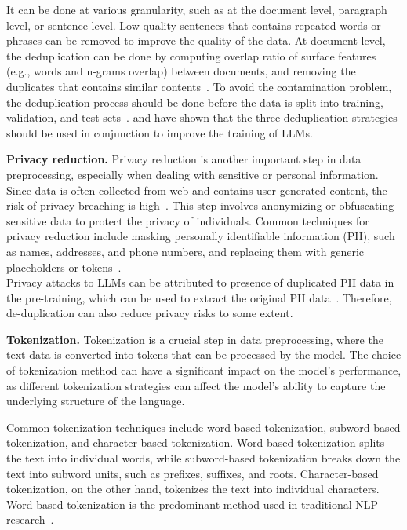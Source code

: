 It can be done at various granularity, such as at the document level, paragraph level, or sentence level.
Low-quality sentences that contains repeated words or phrases can be removed to improve the quality of the data.
At document level, the deduplication can be done by computing overlap ratio of surface features (e.g., words and n-grams overlap) between documents, and removing the duplicates that contains similar contents~\cite{touvron2023llama,rae2021scaling,workshop2023bloom,lee2022deduplicating}.
To avoid the contamination problem, the deduplication process should be done before the data is split into training, validation, and test sets~\cite{chowdhery2022palm}.
\textcite{chowdhery2022palm} and \textcite{carlini2022quantifying} have shown that the three deduplication strategies should be used in conjunction to improve the training of LLMs.

\textbf{Privacy reduction.}
Privacy reduction is another important step in data preprocessing, especially when dealing with sensitive or personal information.
Since data is often collected from web and contains user-generated content, the risk of privacy breaching is high~\cite{carlini2021extracting}.
This step involves anonymizing or obfuscating sensitive data to protect the privacy of individuals.
Common techniques for privacy reduction include masking personally identifiable information (PII), such as names, addresses, and phone numbers, and replacing them with generic placeholders or tokens~\cite{laurencon2022bigscience}.\\
Privacy attacks to LLMs can be attributed to presence of duplicated PII data in the pre-training, which can be used to extract the original PII data~\cite{lee2022deduplicating}.
Therefore, de-duplication can also reduce privacy risks to some extent.

\textbf{Tokenization.}
Tokenization is a crucial step in data preprocessing, where the text data is converted into tokens that can be processed by the model.
The choice of tokenization method can have a significant impact on the model's performance, as different tokenization strategies can affect the model's ability to capture the underlying structure of the language.

Common tokenization techniques include word-based tokenization, subword-based tokenization, and character-based tokenization.
Word-based tokenization splits the text into individual words, while subword-based tokenization breaks down the text into subword units, such as prefixes, suffixes, and roots.
Character-based tokenization, on the other hand, tokenizes the text into individual characters.
Word-based tokenization is the predominant method used in traditional NLP research~\cite{lafferty2001conditional}.

